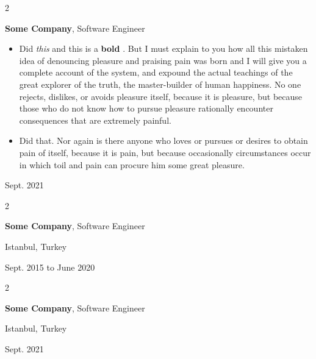 \documentclass[10pt, letterpaper]{article}
\newenvironment{highlights}{
    \begin{itemize}[
        topsep=0.10 cm,
        parsep=0.10 cm,
        partopsep=0pt,
        itemsep=0pt,
        leftmargin=0.4 cm + 10pt
    ]
}{
    \end{itemize}
} %
\newenvironment{twocolentry}[2][]{
    \onecolentry
    \def\secondColumn{#2}
    \setcolumnwidth{\fill, 4.5 cm}
    \begin{paracol}{2}
}{
    \switchcolumn \raggedleft \secondColumn
    \end{paracol}
    \endonecolentry
} %
\let\hrefWithoutArrow\href
\renewcommand{\href}[2]{\hrefWithoutArrow{#1}{\mbox{\ifthenelse{\equal{#2}{}}{ }{#2 }\raisebox{.15ex}{\footnotesize \faExternalLink*}}}}
\begin{document}
        \vspace{0.2 cm}

        \begin{twocolentry}{
            Sept. 2021
        }
            \textbf{Some \textnormal{Company}}, Software Engineer
            \begin{highlights}
                \item Did \textit{this} and this is a \textbf{bold} \href{https://example.com}{link}. But I must explain to you how all this mistaken idea of denouncing pleasure and praising pain was born and I will give you a complete account of the system, and expound the actual teachings of the great explorer of the truth, the master-builder of human happiness. No one rejects, dislikes, or avoids pleasure itself, because it is pleasure, but because those who do not know how to pursue pleasure rationally encounter consequences that are extremely painful.
                \item Did that. Nor again is there anyone who loves or pursues or desires to obtain pain of itself, because it is pain, but because occasionally circumstances occur in which toil and pain can procure him some great pleasure.
            \end{highlights}
        \end{twocolentry}


        \vspace{0.2 cm}

        \begin{twocolentry}{
            Istanbul, Turkey

        Sept. 2015 to June 2020
        }
            \textbf{Some \textnormal{Company}}, Software Engineer
        \end{twocolentry}


        \vspace{0.2 cm}

        \begin{twocolentry}{
            Istanbul, Turkey

        Sept. 2021
        }
            \textbf{Some \textnormal{Company}}, Software Engineer
        \end{twocolentry}


        \vspace{0.2 cm}
\end{document}
